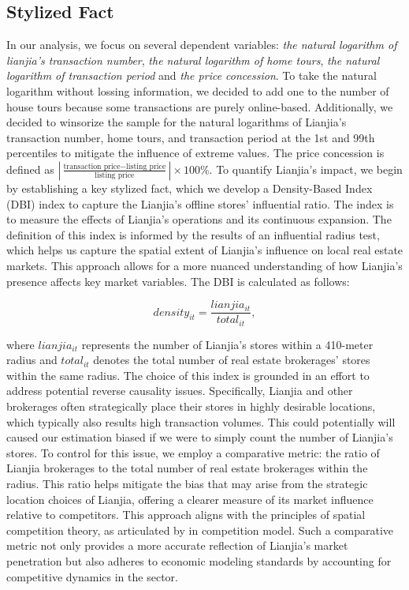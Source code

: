\documentclass[11pt]{article}
\begin{document}
\subsection{Stylized Fact} \label{subsec:stylized_fact}

In our analysis, we focus on several dependent variables: \emph{the natural logarithm of lianjia's transaction number}, \emph{the natural logarithm of home tours}, \emph{the natural logarithm of transaction period} and \emph{the price concession}. To take the natural logarithm without lossing information, we decided to add one to the number of house tours because some transactions are purely online-based. Additionally, we decided to winsorize the sample for the natural logarithms of Lianjia's transaction number, home tours, and transaction period at the 1st and 99th percentiles to mitigate the influence of extreme values. The price concession is defined as $|\frac{\text{transaction price} - \text{listing price}}{\text{listing price}}| \times 100\%$. To quantify Lianjia's impact, we begin by establishing a key stylized fact, which we develop a Density-Based Index (DBI) index to capture the Lianjia's offline stores' influential ratio. The index is to measure the effects of Lianjia's operations and its continuous expansion. The definition of this index is informed by the results of an influential radius test, which helps us capture the spatial extent of Lianjia's influence on local real estate markets. This approach allows for a more nuanced understanding of how Lianjia's presence affects key market variables. The DBI is calculated as follows:

\begin{equation*}
  density_{it} = \frac{lianjia_{it}}{total_{it}},
\end{equation*}

where $lianjia_{it}$ represents the number of Lianjia's stores within a 410-meter radius and $total_{it}$ denotes the total number of real estate brokerages' stores within the same radius. The choice of this index is grounded in an effort to address potential reverse causality issues. Specifically, Lianjia and other brokerages often strategically place their stores in highly desirable locations, which typically also results high transaction volumes. This could potentially will caused our estimation biased if we were to simply count the number of Lianjia's stores. To control for this issue, we employ a comparative metric: the ratio of Lianjia brokerages to the total number of real estate brokerages within the radius. This ratio helps mitigate the bias that may arise from the strategic location choices of Lianjia, offering a clearer measure of its market influence relative to competitors. This approach aligns with the principles of spatial competition theory, as articulated by \citep{hotelling_stability_1929, daspremont_hotellings_1979} in competition model. Such a comparative metric not only provides a more accurate reflection of Lianjia's market penetration but also adheres to economic modeling standards by accounting for competitive dynamics in the sector.
\end{document}
